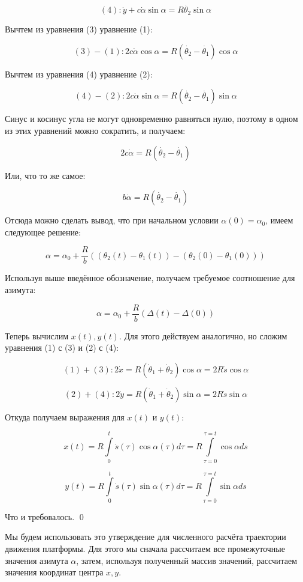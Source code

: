 \documentclass[12pt,a4paper]{article}
\begin{document}
$$
(4): \dot{y} + c \dot{\alpha}\sin{\alpha} = R\dot{\theta_2}\sin{\alpha}
$$

Вычтем из уравнения (3) уравнение (1):

$$
(3) - (1): 2c\dot{\alpha}\cos{\alpha} = R(\dot{\theta_2} - \dot{\theta_1})\cos{\alpha}
$$

Вычтем из уравнения (4) уравнение (2):

$$
(4) - (2): 2c\dot{\alpha}\sin{\alpha} = R(\dot{\theta_2} - \dot{\theta_1})\sin{\alpha}
$$

Синус и косинус угла не могут одновременно равняться нулю, поэтому в одном из этих уравнений можно сократить, и получаем:

$$
2c\dot{\alpha} = R(\dot{\theta_2} - \dot{\theta_1})
$$

\noindent Или, что то же самое:

$$
b\dot{\alpha} = R(\dot{\theta_2} - \dot{\theta_1})
$$

Отсюда можно сделать вывод, что при начальном условии $\alpha(0) = \alpha_0$, имеем следующее решение:

$$
\alpha = \alpha_0 + \frac{R}{b} \left( \left(\theta_2(t) - \theta_1(t)\right) - \left(\theta_2(0) - \theta_1(0)\right) \right)
$$

Используя выше введённое обозначение, получаем требуемое соотношение для азимута:

$$
\alpha = \alpha_0 + \frac{R}{b} \left( \Delta(t) - \Delta(0) \right)
$$

Теперь вычислим $x(t), y(t)$. Для этого действуем аналогично, но сложим уравнения (1) с (3) и (2) с (4):

$$
(1) + (3): 2\dot{x} = R(\dot\theta_1 + \dot\theta_2)\cos{\alpha} = 2R\dot s \cos\alpha
$$

$$
(2) + (4): 2\dot{y} = R(\dot\theta_1 + \dot\theta_2)\sin{\alpha} = 2R\dot s \sin\alpha
$$

\noindent Откуда получаем выражения для $x(t)$ и $y(t)$:

$$
x(t) = R\int\limits_0^t \dot s(\tau)\cos{\alpha(\tau)}d\tau = R\int\limits_{\tau = 0}^{\tau = t} \cos{\alpha}ds
$$

$$
y(t) = R\int\limits_0^t \dot s(\tau)\sin{\alpha(\tau)}d\tau = R\int\limits_{\tau = 0}^{\tau = t} \sin{\alpha}ds
$$

\noindent Что и требовалось. \qed

Мы будем использовать это утверждение для численного расчёта траектории движения платформы. Для этого мы сначала рассчитаем все промежуточные значения азимута $\alpha$, затем, используя полученный массив значений, рассчитаем значения координат центра $x, y$.
\end{document}
